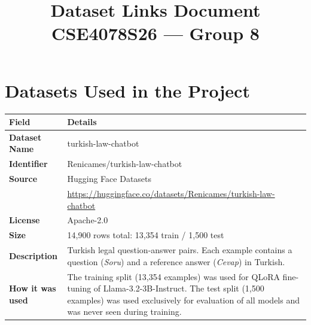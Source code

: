 \documentclass[conference]{IEEEtran}
\begin{document}
\title{Dataset Links Document\\
{\large CSE4078S26 --- Group 8}}

\author{
}

\maketitle

\section*{Datasets Used in the Project}

\begin{table}[h]
\centering
\renewcommand{\arraystretch}{1.4}
\begin{tabular}{>{\bfseries}p{2.8cm} p{5cm}}
\toprule
Field & Details \\
\midrule
Dataset Name      & turkish-law-chatbot \\
\midrule
Identifier        & Renicames/turkish-law-chatbot \\
\midrule
Source            & Hugging Face Datasets \\
                  & \url{https://huggingface.co/datasets/Renicames/turkish-law-chatbot} \\
\midrule
License           & Apache-2.0 \\
\midrule
Size              & 14,900 rows total: 13,354 train / 1,500 test \\
\midrule
Description       & Turkish legal question-answer pairs. Each example contains a question (\textit{Soru}) and a reference answer (\textit{Cevap}) in Turkish. \\
\midrule
How it was used   & The training split (13,354 examples) was used for QLoRA fine-tuning of Llama-3.2-3B-Instruct. The test split (1,500 examples) was used exclusively for evaluation of all models and was never seen during training. \\
\bottomrule
\end{tabular}
\end{table}
\end{document}
